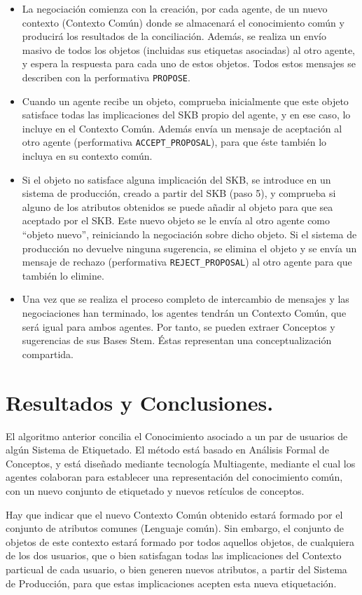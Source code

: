 \begin{itemize}
	\item La negociación comienza con la creación, por cada agente, de un nuevo contexto (Contexto Común) donde se almacenará el conocimiento común y producirá los resultados de la conciliación. Además, se realiza un envío masivo de todos los objetos (incluidas sus etiquetas asociadas) al otro agente, y espera la respuesta para cada uno de estos objetos. Todos estos mensajes se describen con la performativa {\tt PROPOSE}.
	\item Cuando un agente recibe un objeto, comprueba inicialmente que este objeto satisface todas las implicaciones del SKB propio del agente, y en ese caso, lo incluye en el Contexto Común. Además envía un mensaje de aceptación al otro agente (performativa {\tt ACCEPT\_PROPOSAL}), para que éste también lo incluya en su contexto común.
	\item Si el objeto no satisface alguna implicación del SKB, se introduce en un sistema de producción, creado a partir del SKB (paso 5), y comprueba si alguno de los atributos obtenidos se puede añadir al objeto para que sea aceptado por el SKB. Este nuevo objeto se le envía al otro agente como “objeto nuevo”, reiniciando la negociación sobre dicho objeto. Si el sistema de producción no devuelve ninguna sugerencia, se elimina el objeto y se envía un mensaje de rechazo (performativa {\tt REJECT\_PROPOSAL}) al otro agente para que también lo elimine.
	\item Una vez que se realiza el proceso completo de intercambio de mensajes y  las negociaciones han terminado, los agentes tendrán un Contexto Común, que será igual para ambos agentes. Por tanto, se pueden extraer Conceptos y sugerencias de sus Bases Stem. Éstas representan una conceptualización compartida.
\end{itemize}


\section{Resultados y Conclusiones.}

El algoritmo anterior concilia el Conocimiento asociado a un par de usuarios de algún Sistema de Etiquetado. El método está basado en Análisis Formal de Conceptos, y está diseñado mediante tecnología Multiagente, mediante el cual los agentes colaboran para establecer una representación del conocimiento común, con un nuevo conjunto de etiquetado y nuevos retículos de conceptos.

Hay que indicar que el nuevo Contexto Común obtenido estará formado por el conjunto de atributos comunes (Lenguaje común). Sin embargo, el conjunto de objetos de este contexto estará formado por todos aquellos objetos, de cualquiera de los dos usuarios, que o bien satisfagan todas las implicaciones del Contexto particual de cada usuario, o bien generen nuevos atributos, a partir del Sistema de Producción, para que estas implicaciones acepten esta nueva etiquetación.

